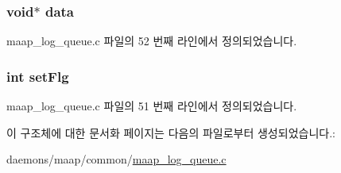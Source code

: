 \subsubsection[{\texorpdfstring{data}{data}}]{\setlength{\rightskip}{0pt plus 5cm}void$\ast$ data}\hypertarget{structmaap__log__queue__elem_a735984d41155bc1032e09bece8f8d66d}{}\label{structmaap__log__queue__elem_a735984d41155bc1032e09bece8f8d66d}


maap\+\_\+log\+\_\+queue.\+c 파일의 52 번째 라인에서 정의되었습니다.

\subsubsection[{\texorpdfstring{set\+Flg}{setFlg}}]{\setlength{\rightskip}{0pt plus 5cm}int set\+Flg}\hypertarget{structmaap__log__queue__elem_aa457306deb1979d52675b298626b010b}{}\label{structmaap__log__queue__elem_aa457306deb1979d52675b298626b010b}


maap\+\_\+log\+\_\+queue.\+c 파일의 51 번째 라인에서 정의되었습니다.



이 구조체에 대한 문서화 페이지는 다음의 파일로부터 생성되었습니다.\+:\begin{DoxyCompactItemize}
\item 
daemons/maap/common/\hyperlink{maap__log__queue_8c}{maap\+\_\+log\+\_\+queue.\+c}\end{DoxyCompactItemize}

